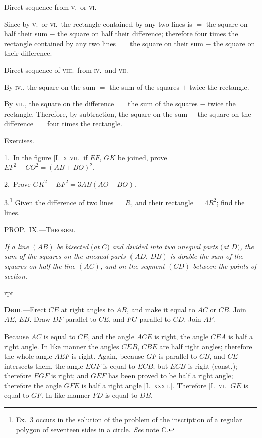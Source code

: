 \documentclass[oneside]{book}
\newcommand\mypropl[2]{
\bigskip\Needspace*{4\baselineskip}\begin{center}\textsc{#1}\end{center}
\hspace{\parindent}\emph{#2}\par\medskip
}
\newcommand\exhead[1]{
\Needspace*{5\baselineskip}\begin{center}
\textsf{#1}
\end{center}
}
\newcommand\imgflow[3]{
\setcounter{wrapwidth}{#1}
\begin{wrapfigure}[#2]{r}{\value{wrapwidth}pt}
\begin{center}
\vspace{-0.3in}
\end{center}
\end{wrapfigure}
}
\begin{document}
Direct sequence from \textsc{v}.\ or \textsc{vi}.

Since by \textsc{v}.\ or \textsc{vi}.\ the rectangle contained by any two
lines is $=$ the square on half their sum $-$ the square on
half their difference; therefore four times the rectangle
contained by any two lines $=$ the square on their sum
$-$ the square on their difference.

Direct sequence of \textsc{viii}.\ from \textsc{iv}.\ and \textsc{vii}.

By \textsc{iv.}, the square on the sum $=$ the sum of the squares
$+$ twice the rectangle.

By \textsc{vii.}, the square on the difference $=$ the sum of the
squares $-$ twice the rectangle. Therefore, by subtraction,
the square on the sum $-$ the square on the
difference $=$ four times the rectangle.


\exhead{Exercises.}

\begin{footnotesize}
1.~In the figure [I.~\textsc{xlvii}.] if $EF$, $GK$ be joined, prove
$EF^2-CO^2 = (AB + BO)^2$.

2.~Prove \hfill $GK^2 - EF^2 = 3AB (AO - BO)$. \hfill \phantom{\indent 2. Prove }

3.\footnote
  {Ex.~3 occurs in the solution of the problem of the inscription
  of a regular polygon of seventeen sides in a circle. \emph{See} note C.}
Given the difference of two lines $= R$, and their rectangle
$= 4R^2$; find the lines.
\par\end{footnotesize}

\mypropl{PROP\@.~IX\@.---Theorem.}{If a line $(AB)$ be bisected $($at $C)$ and divided into two
unequal parts $($at $D)$, the sum of the squares on the unequal
parts $(AD,\ DB)$ is double the sum of the squares on half
the line $(AC)$, and on the segment $(CD)$ between the points
of section.}

\imgflow{145}{9}{f091}

\textbf{Dem}.---Erect $CE$ at right angles to $AB$, and make it
equal to $AC$ or $CB$. Join
$AE$, $EB$. Draw $DF$ parallel
to $CE$, and $FG$ parallel to
$CD$. Join $AF$.

Because $AC$ is equal to $CE$,
and the angle $ACE$ is right,
the angle $CEA$ is half a right
angle. In like manner the
angles $CEB$, $CBE$ are half right angles; therefore the
whole angle $AEF$ is right. Again, because $GF$ is parallel
to $CB$, and $CE$ intersects them, the angle $EGF$ is
equal to $ECB$; but $ECB$ is right (const.); therefore
$EGF$ is right; and $GEF$ has been proved to be half a
right angle; therefore the angle $GFE$ is half a right
angle [I.\ \textsc{xxxii}.]. Therefore [I.\ \textsc{vi}.] $GE$ is equal to
$GF$. In like manner $FD$ is equal to $DB$.
\end{document}
